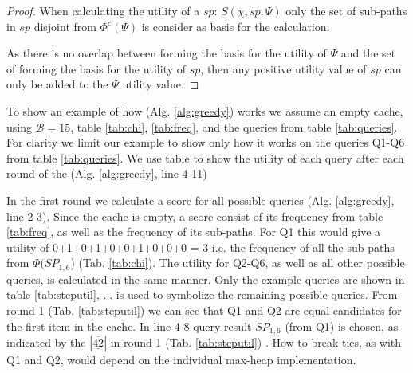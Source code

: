 \begin{proof}

When calculating the utility of a \spath $sp$: $S(\chi, sp, \Psi)$ only the set of sub-paths in $sp$ disjoint from $\Phi^c(\Psi)$ is consider as basis for the calculation. 

As there is no overlap between \spaths forming the basis for the utility of $\Psi$ and the set of \spaths forming the basis for the utility of $sp$, then any positive utility value of $sp$ can only be added to the $\Psi$ utility value. 
\end{proof}


To show an example of how \salgo (Alg. \ref{alg:greedy}) works we assume an empty cache, using $\mathcal{B}=15$, table \ref{tab:chi}, \ref{tab:freq}, and the queries from table \ref{tab:queries}. For clarity we limit our example to show only how it works on the queries Q1-Q6 from table \ref{tab:queries}. We use table \label{tab:steputil} to show the utility of each query after each round of the \salgo (Alg. \ref{alg:greedy}, line 4-11)

In the first round we calculate a score for all possible queries (Alg. \ref{alg:greedy}, line 2-3). Since the cache is empty, a \spath score consist of its frequency from table \ref{tab:freq}, as well as the frequency of its sub-paths. For Q1 this would give a utility of 0+1+0+1+0+0+1+0+0+0 = 3 i.e. the frequency of all the sub-paths from $\Phi(SP_{1,6}$) (Tab. \ref{tab:chi}). The utility for Q2-Q6, as well as all other possible queries, is calculated in the same manner. Only the example queries are shown in table \ref{tab:steputil}, $\dots$ is used to symbolize the remaining possible queries. From round 1 (Tab. \ref{tab:steputil}) we can see that Q1 and Q2 are equal candidates for the first item in the cache. In line 4-8 query result $SP_{1,6}$ (from Q1) is chosen, as indicated by the $| \underline{\overline{42}}|$ in round 1 (Tab. \ref{tab:steputil}) . How to break ties, as with Q1 and Q2, would depend on the individual max-heap implementation. 

